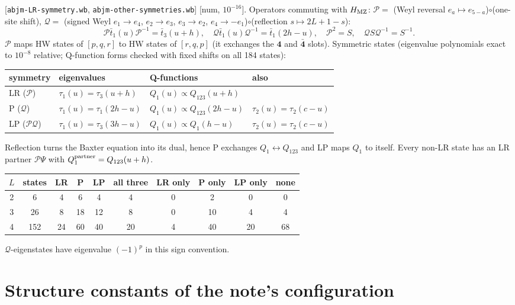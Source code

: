 \documentclass[11pt]{article}
\newcommand{\tb}{\bar t}
\newcommand{\cP}{\mathcal P}
\newcommand{\cQ}{\mathcal Q}
\newcommand{\HMZ}{H_{\rm MZ}}
\newcommand{\nb}[1]{\texttt{#1}}
\newcommand{\num}[1]{\textsf{[num, $#1$]}}
\begin{document}
[\nb{abjm-LR-symmetry.wb}, \nb{abjm-other-symmetries.wb}] \num{10^{-16}}. Operators commuting with $\HMZ$:
$\cP=$ (Weyl reversal $e_a\mapsto e_{5-a}$)$\circ$(one-site shift), $\cQ=$ (signed Weyl $e_1\to e_4$, $e_2\to e_3$,
$e_3\to e_2$, $e_4\to-e_1$)$\circ$(reflection $s\mapsto2L+1-s$):
\begin{equation}
 \cP\tb_1(u)\cP^{-1}=\tb_3(u+h),\quad \cQ\tb_1(u)\cQ^{-1}=\tb_1(2h-u),\quad \cP^2=S,\quad \cQ S\cQ^{-1}=S^{-1}.
\end{equation}
$\cP$ maps HW states of $[p,q,r]$ to HW states of $[r,q,p]$ (it exchanges the $\mathbf4$ and $\bar{\mathbf4}$ slots). Symmetric
states (eigenvalue polynomials exact to $10^{-8}$ relative; Q-function forms checked with fixed shifts on all 184 states):
\begin{center}
\begin{tabular}{llll}
\toprule
symmetry & eigenvalues & Q-functions & also\\
\midrule
LR ($\cP$) & $\tau_1(u)=\tau_3(u+h)$ & $Q_1(u)\propto Q_{123}(u+h)$ & \\
P ($\cQ$) & $\tau_1(u)=\tau_1(2h-u)$ & $Q_1(u)\propto Q_{123}(2h-u)$ & $\tau_2(u)=\tau_2(c-u)$\\
LP ($\cP\cQ$) & $\tau_1(u)=\tau_3(3h-u)$ & $Q_1(u)\propto Q_1(h-u)$ & $\tau_2(u)=\tau_2(c-u)$\\
\bottomrule
\end{tabular}
\end{center}
Reflection turns the Baxter equation into its dual, hence P exchanges $Q_1\leftrightarrow Q_{123}$ and LP maps $Q_1$ to
itself. Every non-LR state has an LR partner $\cP\Psi$ with $Q_1^{\rm partner}=Q_{123}(u+h)$.
\begin{center}
\begin{tabular}{cccccccccc}
\toprule
$L$ & states & LR & P & LP & all three & LR only & P only & LP only & none\\
\midrule
2 & 6 & 4 & 6 & 4 & 4 & 0 & 2 & 0 & 0\\
3 & 26 & 8 & 18 & 12 & 8 & 0 & 10 & 4 & 4\\
4 & 152 & 24 & 60 & 40 & 20 & 4 & 40 & 20 & 68\\
\bottomrule
\end{tabular}
\end{center}
$\cQ$-eigenstates have eigenvalue $(-1)^p$ in this sign convention.

\section{Structure constants of the note's configuration}\label{sec:C}
\end{document}

